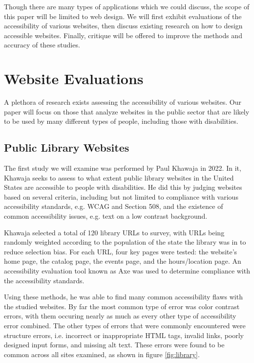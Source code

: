 \documentclass{article}
\begin{document}
Though there are many types of applications which we could discuss, the scope of this paper will be limited to web design.
We will first exhibit evaluations of the accessibility of various websites, then discuss existing research on how to design accessible websites.
Finally, critique will be offered to improve the methods and accuracy of these studies.


\section{Website Evaluations}
A plethora of research exists assessing the accessibility of various websites.
Our paper will focus on those that analyze websites in the public sector that are likely to be used by many different types of people, including those with disabilities.


\subsection{Public Library Websites}
The first study we will examine was performed by Paul Khawaja in 2022.
\cite{Library}
In it, Khawaja seeks to assess to what extent public library websites in the United States are accessible to people with disabilities.
He did this by judging websites based on several criteria, including but not limited to compliance with various accessibility standards, e.g. WCAG and Section 508, and the existence of common accessibility issues, e.g. text on a low contrast background.

Khawaja selected a total of 120 library URLs to survey, with URLs being randomly weighted according to the population of the state the library was in to reduce selection bias.
For each URL, four key pages were tested: the website's home page, the catalog page, the events page, and the hours/location page.
An accessibility evaluation tool known as Axe was used to determine compliance with the accessibility standards.
\cite{Axe}

Using these methods, he was able to find many common accessibility flaws with the studied websites.
By far the most common type of error was color contrast errors, with them occuring nearly as much as every other type of accessibility error combined.
The other types of errors that were commonly encountered were structure errors, i.e. incorrect or inappropriate HTML tags, invalid links, poorly designed input forms, and missing alt text.
These errors were found to be common across all sites examined, as shown in figure \ref{fig:library}.
\end{document}
